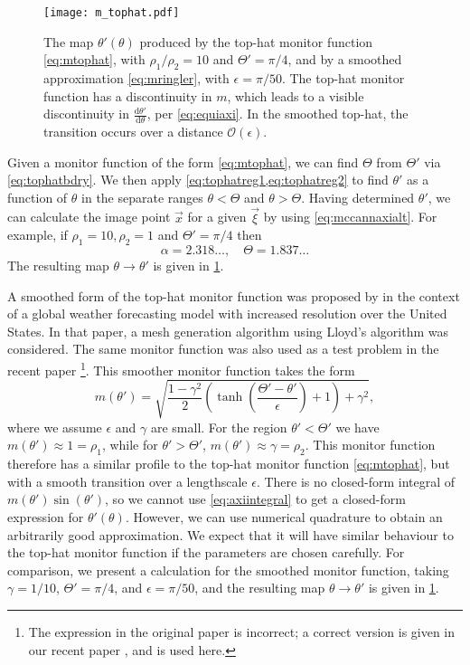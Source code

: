 \documentclass[11pt, a4paper]{scrartcl}  %
\theoremstyle{plain}
\theoremstyle{definition}
\numberwithin{equation}{section}
\newcommand{\dd}[2]{\frac{\mathrm{d} #1}{\mathrm{d} #2}}
\begin{document}
\begin{figure}[!tb]
  \centering
  \texttt{[image: m\_tophat.pdf]}
  \caption{The map $\theta'(\theta)$ produced by the top-hat monitor
function \cref{eq:mtophat}, with $\rho_1/\rho_2 = 10$ and
${\Theta' = \pi/4}$, and by a smoothed approximation \cref{eq:mringler},
with ${\epsilon = \pi/50}$. The top-hat monitor function has a
discontinuity in $m$, which leads to a visible discontinuity in
$\dd{\theta'}{\theta}$, per \cref{eq:equiaxi}. In the smoothed top-hat,
the transition occurs over a distance $\mathcal{O}(\epsilon)$.}
\label{fig:m_tophat}
\end{figure}

Given a monitor function of the form \cref{eq:mtophat}, we can find
$\Theta$ from $\Theta'$ via \cref{eq:tophatbdry}. We then apply
\cref{eq:tophatreg1,eq:tophatreg2} to find $\theta'$ as a function of
$\theta$ in the separate ranges $\theta < \Theta$ and $\theta > \Theta$.
Having determined $\theta'$, we can calculate the image point $\vec{x}$
for a given $\vec{\xi}$ by using \cref{eq:mccannaxialt}.
For example, if $\rho_1 = 10, \rho_2 = 1$ and $\Theta' = \pi/4$ then
\begin{equation}
\alpha = 2.318\ldots , \quad \Theta = 1.837\ldots
\end{equation}
The resulting map $\theta \to \theta'$ is given in \cref{fig:m_tophat}.

A smoothed form of the top-hat monitor function was proposed by
\citet{ringler2011exploring} in the context of a global weather
forecasting model with increased resolution over the United States. In
that paper, a mesh generation algorithm using Lloyd's algorithm was
considered. The same monitor function was also used as a test problem in
the recent paper \citet{weller2016mesh} \footnote{The expression in the
original paper is incorrect; a correct version is given in our recent
paper \citet{mcrae2018optimal}, and is used here.}. This smoother
monitor function takes the form
\begin{equation}
\label{eq:mringler}
m(\theta') = \sqrt{\frac{1 - \gamma^2}{2} \left( \tanh \left( \frac{\Theta' - \theta'}{\epsilon} \right) + 1 \right) + \gamma^2},
\end{equation}
where we assume $\epsilon$ and $\gamma$ are small. For the region
$\theta' < \Theta'$ we have $m(\theta') \approx 1 = \rho_1$, while for
$\theta' > \Theta'$, $m(\theta') \approx \gamma = \rho_2$. This monitor
function therefore has a similar profile to the top-hat monitor function
\cref{eq:mtophat}, but with a smooth transition over a lengthscale
$\epsilon$. There is no closed-form integral of $m(\theta')\sin(\theta')$,
so we cannot use \cref{eq:axiintegral} to get a closed-form expression
for $\theta'(\theta)$. However, we can use numerical quadrature to
obtain an arbitrarily good approximation. We expect that it will have
similar behaviour to the top-hat monitor function if the parameters are
chosen carefully. For comparison, we present a calculation for the
smoothed monitor function, taking $\gamma = 1/10$, $\Theta' = \pi/4$,
and $\epsilon = \pi/50$, and the resulting map $\theta \to \theta'$ is
given in \cref{fig:m_tophat}.
\end{document}
